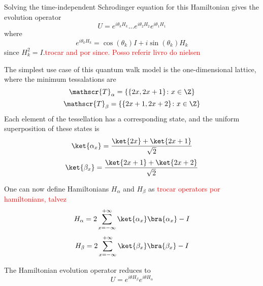             	Solving the time-independent Schrodinger equation for this Hamiltonian gives the evolution operator
            	\begin{equation}
            	    U = e^{i\theta_{k}H_{k}}...e^{i\theta_{2}H_{2}}e^{i\theta_{1}H_{1}}
            	    \label{eq:stagWalkUnmodOp}
            	\end{equation}
            	where
            	\begin{equation}
            	    e^{i\theta_{k}H_{k}} = \cos{(\theta_k)}I + i\sin{(\theta_k)}H_k
            	\end{equation}
            	since $H_k^2 = I$.\textcolor{red}{trocar and por since. Posso referir livro do nielsen}\par
            	The simplest use case of this quantum walk model is the one-dimensional lattice, where the minimum tessalations are
            	\begin{equation}
            	    \mathscr{T}_{\alpha}= \{\{2x,2x+1\}\colon x \in \Z\}
            	\end{equation}
            	\begin{equation}
            	    \mathscr{T}_{\beta}= \{\{2x+1,2x+2\}\colon x \in \Z\}
            	\end{equation}
            	 Each element of the tessellation has a corresponding state, and the uniform superposition of these states is
            	\begin{equation}
            	    \ket{\alpha_x} = \frac{\ket{2x} + \ket{2x+1}}{\sqrt{2}}
            	\end{equation}
            	\begin{equation}
            	    \ket{\beta_x} = \frac{\ket{2x+1}+\ket{2x+2}}{\sqrt{2}}
            	\end{equation}\par
            	One can now define Hamiltonians $H_\alpha$ and $H_\beta$ as \textcolor{red}{trocar operators por hamiltonians, talvez} 
            	\begin{equation}
            	    H_\alpha = 2\sum_{x=-\infty}^{+\infty}\ket{\alpha_{x}}\bra{\alpha_x} - I
            	\end{equation}
            	\begin{equation}
            	    H_\beta = 2\sum_{x=-\infty}^{+\infty}\ket{\beta_{x}}\bra{\beta_x} - I
            	\end{equation}\par
            	The Hamiltonian evolution operator reduces to
            	\begin{equation}
            	    U = e^{i\theta H_\beta}e^{i\theta H_\alpha}
            	\end{equation}
